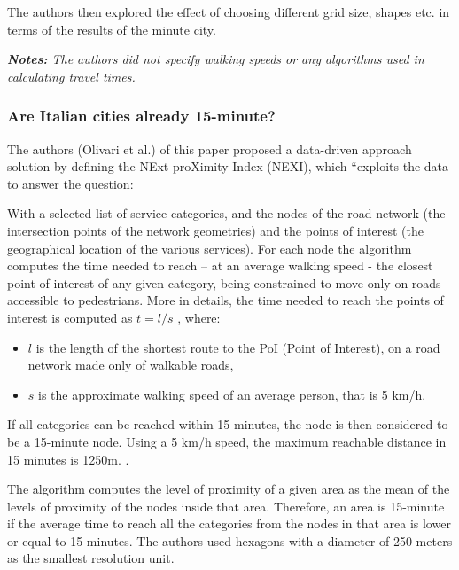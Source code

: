 The authors then explored the effect of choosing different grid size, shapes etc. in terms of the results of the minute city.

\textit{\textbf{Notes:} The authors did not specify walking speeds or any algorithms used in calculating travel times.}

\subsubsection{Are Italian cities already 15-minute? \texorpdfstring{\cite{olivari_are_2023}}{}} \label{olivari_are_2023}

The authors (Olivari et al.) of this paper proposed a data-driven approach solution by defining the NExt proXimity Index (NEXI), which “exploits the data to answer the question: 

With a selected list of service categories, and the nodes of the road network (the intersection points of the network geometries) and the points of interest (the geographical location of the various services). For each node the algorithm computes the time needed to reach – at an average walking speed - the closest point of interest of any given category, being constrained to move only on roads accessible to pedestrians. More in details, the time needed to reach the points of interest is computed as $t = l / s$ , where:

\begin{itemize}
\item $l$ is the length of the shortest route to the PoI (Point of Interest), on a road network made only of walkable roads,
\item $s$ is the approximate walking speed of an average person, that is 5 km/h.
\end{itemize}

If all categories can be reached within 15 minutes, the node is then considered to be a 15-minute node. Using a 5 km/h speed, the maximum reachable distance in 15 minutes is 1250m. .

The algorithm computes the level of proximity of a given area as the mean of the levels of proximity of the nodes inside that area. Therefore, an area is 15-minute if the average time to reach all the categories from the nodes in that area is lower or equal to 15 minutes. The authors used hexagons with a diameter of 250 meters as the smallest resolution unit.

